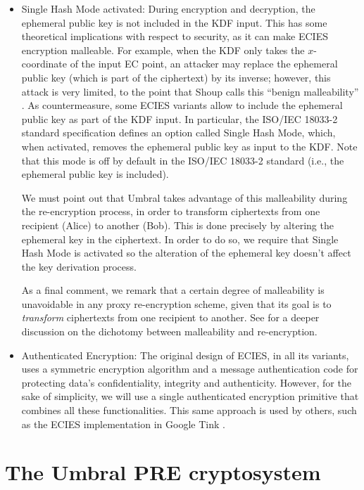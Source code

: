 \documentclass{amsart}
\begin{document}
\begin{itemize}

\item Single Hash Mode activated: 
During encryption and decryption, the ephemeral public key is not included in the KDF input. This has some theoretical implications with respect to security, as it can make ECIES encryption malleable. For example, when the KDF only takes the $x$-coordinate of the input EC point, an attacker may replace the ephemeral public key (which is part of the ciphertext) by its inverse; however, this attack is very limited, to the point that Shoup calls this ``benign malleability'' \cite{shoup}. As countermeasure, some ECIES variants allow to include the ephemeral public key as part of the KDF input. In particular, the ISO/IEC 18033-2 standard specification defines an option called Single Hash Mode, which, when activated, removes the ephemeral public key as input to the KDF. Note that this mode is off by default in the ISO/IEC 18033-2 standard (i.e., the ephemeral public key is included).

We must point out that Umbral takes advantage of this malleability during the re-encryption process, in order to transform ciphertexts from one recipient (Alice) to another (Bob). This is done precisely by altering the ephemeral key in the ciphertext. In order to do so, we require that Single Hash Mode is activated so the alteration of the ephemeral key doesn't affect the key derivation process. 

As a final comment, we remark that a certain degree of malleability is unavoidable in any proxy re-encryption scheme, given that its goal is to \emph{transform} ciphertexts from one recipient to another. See \cite{canetti2007chosen} for a deeper discussion on the dichotomy between malleability and re-encryption.


\item Authenticated Encryption: The original design of ECIES, in all its variants, uses a symmetric encryption algorithm and a message authentication code for protecting data's confidentiality, integrity and authenticity. However, for the sake of simplicity, we will use a single authenticated encryption primitive that combines all these functionalities. This same approach is used by others, such as the ECIES implementation in Google Tink \cite{tink}. 

\end{itemize}



\section{The Umbral PRE cryptosystem}
\end{document}
